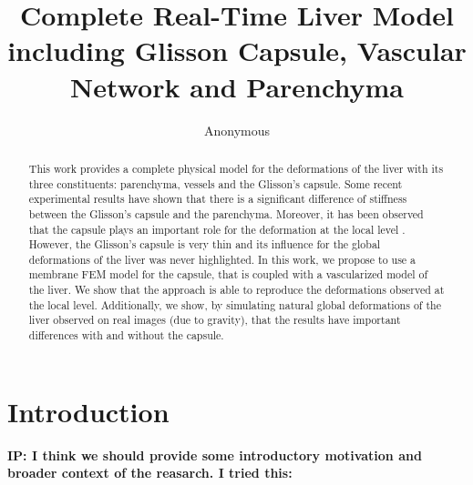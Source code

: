 \documentclass{llncs}
\newcommand{\IP}[1]{{\color{cyan}\textbf{IP: #1}}}
\begin{document}
%
%
\mainmatter              %
%
\title{Complete Real-Time Liver Model including Glisson Capsule, Vascular Network and Parenchyma}
%
%
\author{Anonymous}
%
%
%
\maketitle

\begin{abstract}
This work provides a complete physical model for the deformations of the liver with its three constituents: parenchyma, vessels and the Glisson's capsule.
Some recent experimental results \cite{Ahn2010} have shown that there is a significant difference of stiffness between the Glisson's capsule and the parenchyma. 
Moreover, it has been observed that the capsule plays an important role for the deformation at the local level \cite{Hollenstein2006}.
However, the Glisson's capsule is very thin and its influence for the global deformations of the liver was never highlighted.
In this work, we propose to use a membrane FEM model for the capsule, that is coupled with a vascularized model of the liver.
We show that the approach is able to reproduce the deformations observed at the local level.
Additionally, we show, by simulating natural global deformations of the liver observed on real images (due to gravity), that the results have important differences with and without the capsule.

\end{abstract}

\section{Introduction} 
\IP{I think we should provide some introductory motivation and broader context of the reasarch. I tried this:}
\end{document}
